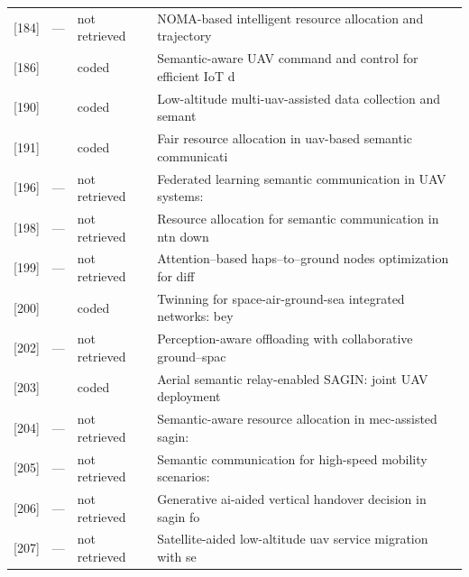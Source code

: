 \begin{longtable}{rll p{52mm}}
{[184]} & --- & not retrieved & NOMA-based intelligent resource allocation and trajectory  \\
{[186]} & \cite{sankara2026r186} & coded & Semantic-aware UAV command and control for efficient IoT d \\
{[190]} & \cite{zheng2026r190} & coded & Low-altitude multi-uav-assisted data collection and semant \\
{[191]} & \cite{siyun2025r191} & coded & Fair resource allocation in uav-based semantic communicati \\
{[196]} & --- & not retrieved & Federated learning semantic communication in UAV systems:  \\
{[198]} & --- & not retrieved & Resource allocation for semantic communication in ntn down \\
{[199]} & --- & not retrieved & Attention–based haps–to–ground nodes optimization for diff \\
{[200]} & \cite{qiu2025r200} & coded & Twinning for space-air-ground-sea integrated networks: bey \\
{[202]} & --- & not retrieved & Perception-aware offloading with collaborative ground–spac \\
{[203]} & \cite{yin2025r203} & coded & Aerial semantic relay-enabled SAGIN: joint UAV deployment  \\
{[204]} & --- & not retrieved & Semantic-aware resource allocation in mec-assisted sagin:  \\
{[205]} & --- & not retrieved & Semantic communication for high-speed mobility scenarios:  \\
{[206]} & --- & not retrieved & Generative ai-aided vertical handover decision in sagin fo \\
{[207]} & --- & not retrieved & Satellite-aided low-altitude uav service migration with se \\
\end{longtable}
